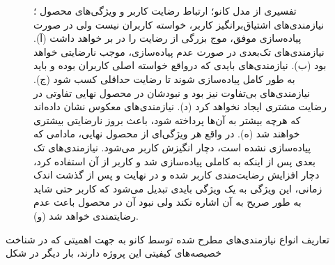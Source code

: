 \begin{figure}[H]
{	}
	\hspace{0mm}
	\caption[تفسیری از مدل کانو؛ ارتباط رضایت کاربر و ویژگی‌های محصول]
	{تفسیری از مدل کانو؛ ارتباط رضایت کاربر و ویژگی‌های محصول
		\cite{noauthor_leveraging_2012}؛
		نیازمندی‌های اشتیاق‌برانگیز کاربر، خواسته کاربران نیست ولی در صورت پیاده‌سازی موفق، موج بزرگی از رضایت را در بر خواهد داشت (آ). نیازمندی‌های تک‌بعدی در صورت عدم پیاده‌سازی، موجب نارضایتی خواهد بود (ب). نیازمندی‌های بایدی که درواقع خواسته اصلی کاربران بوده و باید به طور کامل پیاده‌سازی شوند تا رضایت حداقلی کسب شود (ج). نیازمندی‌های بی‌تفاوت نیز بود و نبودشان در محصول نهایی تفاوتی در رضایت مشتری ایجاد نخواهد کرد (د). نیازمندی‌های معکوس نشان داده‌اند که هرچه بیشتر به آن‌ها پرداخته شود، باعث بروز نارضایتی بیشتری خواهند شد (ه). در واقع هر ویژگی‌ای از محصول نهایی، مادامی که پیاده‌سازی نشده است، دچار انگیزش کاربر می‌شود. نیازمندی‌های تک بعدی پس از اینکه به کاملی پیاده‌سازی شد و کاربر از آن استفاده کرد، دچار افزایش رضایت‌مندی کاربر شده و در نهایت و پس از گذشت اندک زمانی، این ویژگی به یک ویژگی بایدی تبدیل می‌شود که کاربر حتی شاید به طور صریح به آن اشاره نکند ولی نبود آن در محصول باعث عدم رضایتمندی خواهد شد (و).
	}
	\label{fig:kano2}
\end{figure}
تعاریف انواع نیازمندی‌های مطرح شده توسط کانو به جهت اهمیتی که در شناخت خصیصه‌های کیفیتی این پروژه دارند، بار دیگر در شکل
